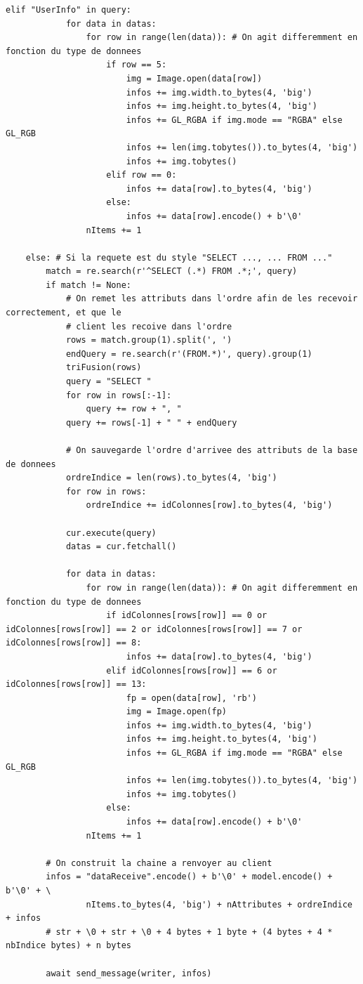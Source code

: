 \documentclass{report}
\begin{document}
\begin{appendix}
\begin{lstlisting}[style=py, caption=serveur.py : SQL, label=sql]
        elif "UserInfo" in query:
            for data in datas:
                for row in range(len(data)): # On agit differemment en fonction du type de donnees
                    if row == 5:
                        img = Image.open(data[row])
                        infos += img.width.to_bytes(4, 'big')
                        infos += img.height.to_bytes(4, 'big')
                        infos += GL_RGBA if img.mode == "RGBA" else GL_RGB
                        infos += len(img.tobytes()).to_bytes(4, 'big')
                        infos += img.tobytes()
                    elif row == 0:
                        infos += data[row].to_bytes(4, 'big')
                    else:
                        infos += data[row].encode() + b'\0'
                nItems += 1
    
    else: # Si la requete est du style "SELECT ..., ... FROM ..."
        match = re.search(r'^SELECT (.*) FROM .*;', query)
        if match != None:
            # On remet les attributs dans l'ordre afin de les recevoir correctement, et que le
            # client les recoive dans l'ordre
            rows = match.group(1).split(', ')
            endQuery = re.search(r'(FROM.*)', query).group(1)
            triFusion(rows)
            query = "SELECT "
            for row in rows[:-1]:
                query += row + ", "
            query += rows[-1] + " " + endQuery

            # On sauvegarde l'ordre d'arrivee des attributs de la base de donnees
            ordreIndice = len(rows).to_bytes(4, 'big')
            for row in rows:
                ordreIndice += idColonnes[row].to_bytes(4, 'big')

            cur.execute(query)
            datas = cur.fetchall()

            for data in datas:
                for row in range(len(data)): # On agit differemment en fonction du type de donnees
                    if idColonnes[rows[row]] == 0 or idColonnes[rows[row]] == 2 or idColonnes[rows[row]] == 7 or idColonnes[rows[row]] == 8:
                        infos += data[row].to_bytes(4, 'big')
                    elif idColonnes[rows[row]] == 6 or idColonnes[rows[row]] == 13:
                        fp = open(data[row], 'rb')
                        img = Image.open(fp)
                        infos += img.width.to_bytes(4, 'big')
                        infos += img.height.to_bytes(4, 'big')
                        infos += GL_RGBA if img.mode == "RGBA" else GL_RGB
                        infos += len(img.tobytes()).to_bytes(4, 'big')
                        infos += img.tobytes()
                    else:
                        infos += data[row].encode() + b'\0'
                nItems += 1

        # On construit la chaine a renvoyer au client
        infos = "dataReceive".encode() + b'\0' + model.encode() + b'\0' + \
                nItems.to_bytes(4, 'big') + nAttributes + ordreIndice + infos
        # str + \0 + str + \0 + 4 bytes + 1 byte + (4 bytes + 4 * nbIndice bytes) + n bytes
        
        await send_message(writer, infos)
\end{lstlisting}
\end{appendix}
\end{document}
